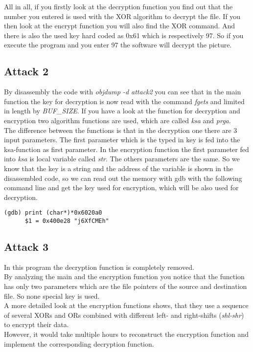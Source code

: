 All in all, if you firstly look at the decryption function you find out that the number you entered is used with the XOR algorithm to decrypt the file. If you then look at the encrypt function you will also find the XOR command. And there is also the used key hard coded as 0x61 which is respectively 97. So if you execute the program and you enter 97 the software will decrypt the picture.\\

\subsection{Attack 2}
By disassembly the code with \textit{objdump -d attack2} you can see that in the main function the key for decryption is now read with the command \textit{fgets} and  limited in length by \textit{BUF\_SIZE}. If you have a look at the function for decryption and encryption two algorithm functions are used, which are called \textit{ksa} and \textit{prga}.\\
The difference between the functions is that in the decryption one there are 3 input parameters. The first parameter which is the typed in key is fed into the ksa-function as first parameter. In the encryption function the first parameter fed into \textit{ksa} is local variable called \textit{str}. The others parameters are the same. So we know that the key is a string and the address of the variable is shown in the disassembled code, so we can read out the memory with gdb with the following command line and get the key used for encryption, which will be also used for decryption.

\begin{lstlisting}
(gdb) print (char*)*0x6020a0
  	  $1 = 0x400e28 "j6XfCMEh"
\end{lstlisting}


\subsection{Attack 3}

In this program the decryption function is completely removed.\\ By analyzing the main and the encryption function you notice that the function has only two parameters which are the file pointers of the source and destination file. So none special key is used.\\

A more detailed look at the encryption functions shows, that they use a sequence of several XORs and ORs combined with different left- and right-shifts (\textit{shl-shr}) to encrypt their data.\\

However, it would take multiple hours to reconstruct the encryption function and implement the corresponding decryption function.